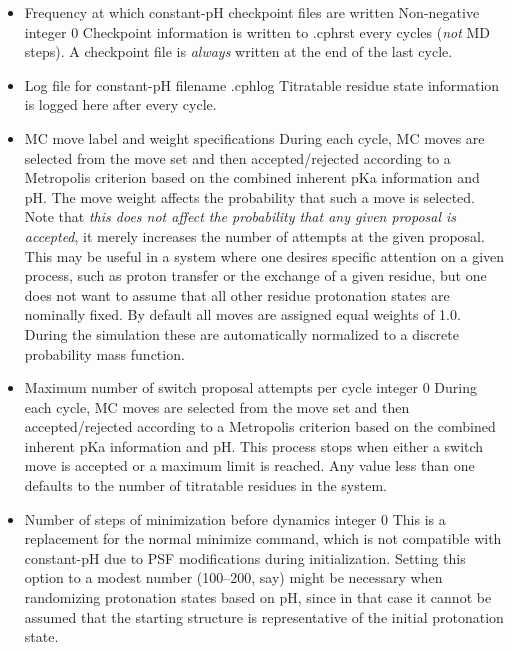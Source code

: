 \begin{itemize}
\item {}
{Frequency at which constant-pH checkpoint files are written}
{Non-negative integer}
{0}
{
Checkpoint information is written to \KEY{[outputname]}.cphrst every 
   cycles (\emph{not} MD steps).
A checkpoint file is \emph{always} written at the end of the last cycle.
}

\item {}
{Log file for constant-pH}
{filename}
{\KEY{[outputname]}.cphlog}
{Titratable residue state information is logged here after every cycle.}

\item {}
{MC move label and weight specifications}
{
 
}
{
During each cycle, MC moves are selected from the move set and then 
  accepted/rejected according to a Metropolis criterion based on the combined 
  inherent pKa information and pH.
The move weight affects the probability that such a move is selected. 
Note that \emph{this does not affect the probability that any given proposal
  is accepted}, it merely increases the number of attempts at the given
  proposal.
This may be useful in a system where one desires specific attention on a given
  process, such as proton transfer or the exchange of a given residue, but one
  does not want to assume that all other residue protonation states are
  nominally fixed.
By default all moves are assigned equal weights of 1.0.
During the simulation these are automatically normalized to a discrete
  probability mass function.
}

\item {}
{Maximum number of switch proposal attempts per cycle}
{integer}
{0}
{
During each cycle, MC moves are selected from the move set and then
  accepted/rejected according to a Metropolis criterion based on the combined
  inherent pKa information and pH.
This process stops when either a switch move is accepted or a maximum limit is
  reached.
Any value less than one defaults to the number of titratable residues in the
  system.
}

\item {}
{Number of steps of minimization before dynamics}
{integer}
{0}
{
This is a replacement for the normal minimize command, which is not compatible
  with constant-pH due to PSF modifications during initialization.
Setting this option to a modest number (100--200, say) might be necessary when
  randomizing protonation states based on pH, since in that case it cannot be
  assumed that the starting structure is representative of the initial
  protonation state.
}

\end{itemize}

